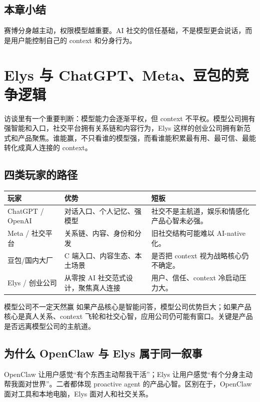 \documentclass[a4paper]{article}
\begin{document}
\subsection{本章小结}

赛博分身越主动，权限模型越重要。AI 社交的信任基础，不是模型更会说话，而是用户能控制自己的 context 和分身行为。

\section{Elys 与 ChatGPT、Meta、豆包的竞争逻辑}

访谈里有一个重要判断：模型能力会逐渐平权，但 context 不平权。模型公司拥有强智能和入口，社交平台拥有关系链和内容行为，Elys 这样的创业公司拥有新范式和产品聚焦。谁能赢，不只看谁的模型强，而看谁能积累最有用、最可信、最能转化成真人连接的 context。

\subsection{四类玩家的路径}

\noindent\begin{longtable}{p{}p{}p{}}
\toprule
玩家 & 优势 & 短板 \\
\midrule
ChatGPT / OpenAI & 对话入口、个人记忆、强模型 & 社交不是主航道，娱乐和情感化产品心智未必强。 \\
Meta / 社交平台 & 关系链、内容、身份和分发 & 旧社交结构可能难以 AI-native 化。 \\
豆包/国内大厂 & C 端入口、内容生态、本土场景 & 是否把 context 视为战略核心仍不确定。 \\
Elys / 创业公司 & 从零按 AI 社交范式设计，聚焦真人连接 & 用户、信任、context 冷启动压力大。 \\
\bottomrule
\end{longtable}

\begin{warningbox}{模型公司不一定天然赢}
如果产品核心是智能问答，模型公司优势巨大；如果产品核心是真人关系、context 飞轮和社交心智，应用公司仍可能有窗口。关键是产品是否远离模型公司的主航道。
\end{warningbox}

\subsection{为什么 OpenClaw 与 Elys 属于同一叙事}

OpenClaw 让用户感觉“有个东西主动帮我干活”；Elys 让用户感觉“有个分身主动帮我面对世界”。二者都体现 proactive agent 的产品心智。区别在于，OpenClaw 面对工具和本地电脑，Elys 面对人和社交关系。
\end{document}
